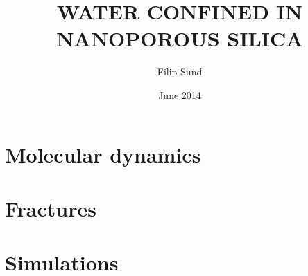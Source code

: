 \documentclass[twoside,english,a4paper,12pt]{uiofysmaster}
\author{Filip Sund}
\title{\uppercase{Water confined in\\ nanoporous silica}}
\date{June 2014}
\begin{document}

\cleardoublepage


% 


\tableofcontents



\part{Molecular dynamics\label{part:md}}
    
    
        
        
        
        
        
        
    
        
        
        
    
        
        

\part{Fractures}
    
    
        
        
    
        
        
            
            
            
            
        
            

\part{Simulations}
    
    
        
        
        \FloatBarrier
        
    
        
        
        \FloatBarrier
        
        
        
        \FloatBarrier
        
        
        
\end{document}

